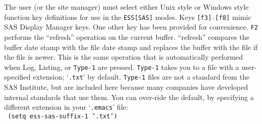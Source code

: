 \documentclass{article}
\newcommand{\stexttt}[1]{{\small\texttt{#1}}}
\newcommand{\elcode}[1]{\\{\stexttt{\hspace*{2em} #1}}\\}
\newcommand{\file}[1]{`\stexttt{#1}'}
\begin{document}
The user (or the site manager) must select either Unix style or
Windows style function key definitions for use in the
\stexttt{ESS[SAS]} modes.
Keys \stexttt{[f3]}--\stexttt{[f8]} mimic SAS Display Manager keys.  One
other key has been provided for convenience.  \stexttt{F2} performs the
``refresh'' operation on the current buffer.  ``refresh'' compares the
buffer date stamp with the file date stamp and replaces the buffer with
the file if the file is newer.  This is the same operation that is
automatically performed when Log, Listing, or \stexttt{Type-1} are
pressed.  \stexttt{Type-1} takes you to a file with a user-specified
extension; \file{.txt} by default.  \stexttt{Type-1} files are not a
standard from the SAS Institute, but are included here because many
companies have developed internal standards that use them.  You can
over-ride the default, by specifying a different extension in your
\file{.emacs} file: \elcode{(setq ess-sas-suffix-1 '.txt')}
\end{document}
